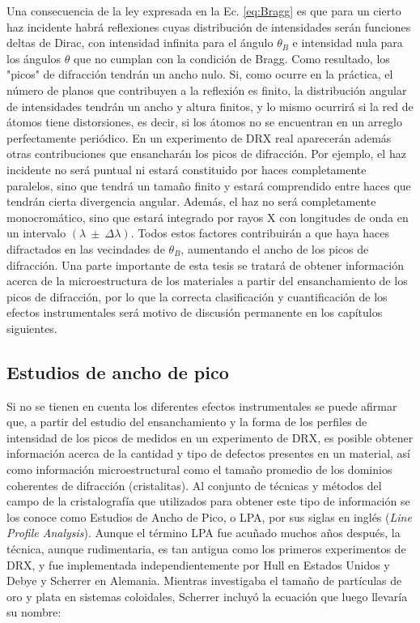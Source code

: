 Una consecuencia de la ley expresada en la Ec. \ref{eq:Bragg} es que para un cierto haz incidente habrá reflexiones cuyas distribución de intensidades serán funciones deltas de Dirac, con intensidad infinita para el ángulo $\theta_{B}$ e intensidad nula para los ángulos $\theta$ que no cumplan con la condición de Bragg. 
Como resultado, los "picos" de difracción tendrán un ancho nulo. 
Si, como ocurre en la práctica, el número de planos que contribuyen a la reflexión es finito, la distribución angular de intensidades tendrán un ancho y altura finitos, y lo mismo ocurrirá si la red de átomos tiene distorsiones, es decir, si los átomos no se encuentran en un arreglo perfectamente periódico.
En un experimento de DRX real aparecerán además otras contribuciones que ensancharán los picos de difracción. 
Por ejemplo, el haz incidente no será puntual ni estará constituido por haces completamente paralelos, sino que tendrá un tamaño finito y estará comprendido entre haces que tendrán cierta divergencia angular.
Además, el haz no será completamente monocromático, sino que estará integrado por rayos X con longitudes de onda en un intervalo $(\lambda \ \pm \ \Delta \lambda)$.
Todos estos factores contribuirán a que haya haces difractados en las vecindades de $\theta_{B}$, aumentando el ancho de los picos de difracción. 
Una parte importante de esta tesis se tratará de obtener información acerca de la microestructura de los materiales a partir del ensanchamiento de los picos de difracción, por lo que la correcta clasificación y cuantificación de los efectos instrumentales será motivo de discusión permanente en los capítulos siguientes.

\subsection{Estudios de ancho de pico}\label{SS:DRX-LPA} 
Si no se tienen en cuenta los diferentes efectos instrumentales se puede afirmar que, a partir del estudio del ensanchamiento y la forma de los perfiles de intensidad de los picos de medidos en un experimento de DRX, es posible obtener información acerca de la cantidad y tipo de defectos presentes en un material, así como información microestructural como el tamaño promedio de los dominios coherentes de difracción (cristalitas).
Al conjunto de técnicas y métodos del campo de la cristalografía que utilizados para obtener este tipo de información se los conoce como Estudios de Ancho de Pico, o LPA, por sus siglas en inglés (\textit{Line Profile Analysis}).
Aunque el término LPA fue acuñado muchos años después, la técnica, aunque rudimentaria, es tan antigua como los primeros experimentos de DRX, y fue implementada independientemente por Hull en Estados Unidos y Debye y Scherrer en Alemania. 
Mientras investigaba el tamaño de partículas de oro y plata en sistemas coloidales, Scherrer incluyó la ecuación que luego llevaría su nombre\cite{Scherrer1918}:

